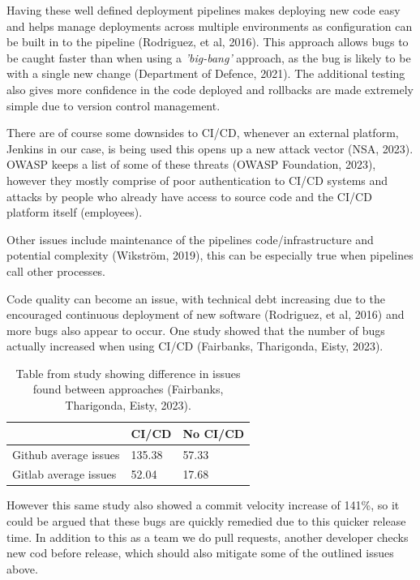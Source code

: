  Having these well defined deployment pipelines makes deploying new code easy and helps manage deployments across multiple environments as configuration 
  can be built in to the pipeline (Rodriguez, et al, 2016). This approach allows bugs to be caught faster than when using 
  a \textit{'big-bang'} approach, as the bug is likely to be with a single new change (Department of Defence, 2021).
  The additional testing also gives more confidence in the code deployed and rollbacks are made extremely simple due to version control management.

  \vspace{0.2cm}

  There are of course some downsides to CI/CD, whenever an external platform, Jenkins in our case, is being used this opens up a new attack vector (NSA, 2023).
  OWASP keeps a list of some of these threats (OWASP Foundation, 2023), however they mostly comprise of poor 
  authentication to CI/CD systems and attacks by people who already have access to source code and the CI/CD platform itself (employees).

  Other issues include maintenance of the pipelines code/infrastructure and potential complexity (Wikström, 2019),
  this can be especially true when pipelines call other processes. 

  Code quality can become an issue, with technical debt increasing due to the encouraged continuous deployment of new software (Rodriguez, et al, 2016) 
  and more bugs also appear to occur. One study showed that the number of bugs actually increased when using CI/CD (Fairbanks, Tharigonda, Eisty, 2023).

  \begin{table}[H]
    \centering
    \begin{tabular}{|p{}|p{}|p{}|}
      \hline
      & CI/CD & No CI/CD \\ \hline
      Github average issues & 135.38 & 57.33 \\ \hline
      Gitlab average issues & 52.04 & 17.68 \\ \hline
    \end{tabular}
    \caption{Table from study showing difference in issues found between approaches (Fairbanks, Tharigonda, Eisty, 2023).}
  \end{table}
  
  However this same study also showed a commit velocity increase of 141\%, so it could be argued that these bugs are quickly remedied due to this quicker 
  release time. In addition to this as a team we do pull requests, another developer checks new cod before release, which should also mitigate some 
  of the outlined issues above.

